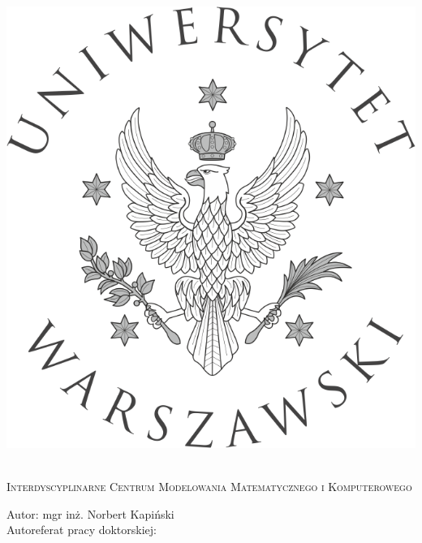 
\newpage
\thispagestyle{empty}



\begin{onehalfspacing}
\begin{center}

\centering
\includegraphics[keepaspectratio,scale=0.9]{./figures/Logo-UW.jpg} \\[.5cm]


{\fontsize{17}{17}\selectfont
\textsc{ \\[.3cm]
Interdyscyplinarne Centrum Modelowania Matematycznego i Komputerowego  \\[0.5cm]
}

\large
{Autor: mgr inż. Norbert Kapiński  \\[1.3cm]}
\small
{Autoreferat pracy doktorskiej: \\[0.3cm]}

}
\end{center}
\end{onehalfspacing}
